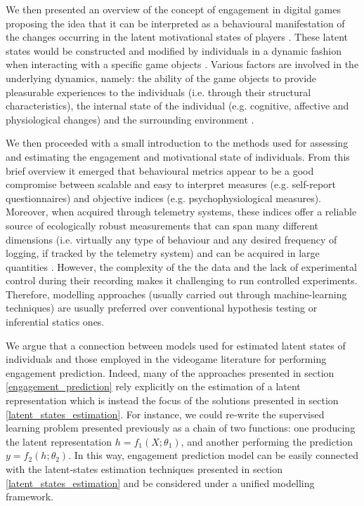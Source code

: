 We then presented an overview of the concept of engagement in digital games proposing the idea that it can be interpreted as a behavioural manifestation of the changes occurring in the latent motivational states of players \cite{o2008user,berridge2004motivation}. These latent states would be constructed and modified by individuals in a dynamic fashion when interacting with a specific game objects \cite{o2008user,berridge2004motivation}. Various factors are involved in the underlying dynamics, namely: the ability of the game objects to provide pleasurable experiences to the individuals (i.e. through their structural characteristics), the internal state of the individual (e.g. cognitive, affective and physiological changes) and the surrounding environment \cite{lucas2004sex,o2008user,jennett2008measuring,boyle2012engagement,connolly2012systematic,berridge2004motivation,csikszentmihalyi2014toward}. 

We then proceeded with a small introduction to the methods used for assessing and estimating the engagement and motivational state of individuals. From this brief overview it emerged that behavioural metrics appear to be a good compromise between scalable and easy to interpret measures (e.g. self-report questionnaires) and objective indices (e.g. psychophysiological measures). Moreover, when acquired through telemetry systems, these indices offer a reliable source of ecologically robust measurements that can span many different dimensions (i.e. virtually any type of behaviour and any desired frequency of logging, if tracked by the telemetry system) and can be acquired in large quantities \cite{el2016game}. However, the complexity of the the data and the lack of experimental control during their recording makes it challenging to run controlled experiments. Therefore, modelling approaches (usually carried out through machine-learning techniques) are usually preferred over conventional hypothesis testing or inferential statics ones. 

We argue that a connection between models used for estimated latent states of individuals and those employed in the videogame literature for performing engagement prediction. Indeed, many of the approaches presented in section \ref{engagement_prediction}  rely explicitly on the estimation of a latent representation which is instead the focus of the solutions presented in section \ref{latent_states_estimation}. For instance, we could re-write the supervised learning problem  presented previously as a chain of two functions: one producing the latent representation $h = f_1(X; \theta_1)$, and another performing the prediction $y = f_2(h; \theta_2)$. In this way, engagement prediction model can be easily connected with the latent-states estimation techniques presented in section \ref{latent_states_estimation} and be considered under a unified modelling framework. 

